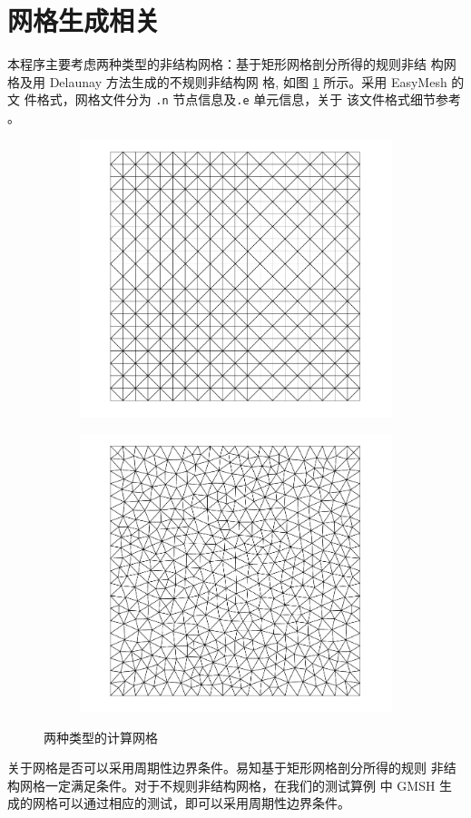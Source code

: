 \section{网格生成相关}
\label{sec:mesh-generation}
本程序主要考虑两种类型的非结构网格：基于矩形网格剖分所得的规则非结
构网格及用 Delaunay 方法生成的不规则非结构网
格, 如图 \ref{fig:computing-grid-compare} 所示。采用 EasyMesh 的文
件格式，网格文件分为 \verb|.n| 节点信息及\verb|.e| 单元信息，关于
该文件格式细节参考 \cite{EasyMesh}。
\begin{figure}[htbp]
  \centering
  \begin{subfigure}
    \centering
    \includegraphics[width=.45\linewidth]{./figs/rect20.png}
  \end{subfigure}%
  \begin{subfigure}
    \centering
    \includegraphics[width=.45\linewidth]{./figs/gmsh20.png}
  \end{subfigure}
  \caption{两种类型的计算网格}
  \label{fig:computing-grid-compare}
\end{figure}

关于网格是否可以采用周期性边界条件。易知基于矩形网格剖分所得的规则
非结构网格一定满足条件。对于不规则非结构网格，在我们的测试算例
中 GMSH 生成的网格可以通过相应的测试，即可以采用周期性边界条件。

